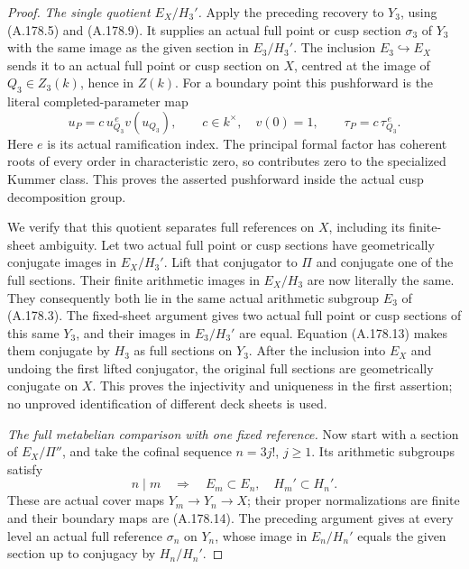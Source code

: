 \begin{proof}
\emph{The single quotient \(E_X/H_3'\).}
Apply the preceding recovery to \(Y_3\), using
(A.178.5) and (A.178.9).  It supplies an actual full point
or cusp section \(\sigma_3\) of \(Y_3\) with the same
image as the given section in \(E_3/H_3'\).
The inclusion \(E_3\hookrightarrow E_X\) sends it to
an actual full point or cusp section on \(X\), centred at
the image of \(Q_3\in Z_3(k)\), hence in \(Z(k)\).
For a boundary point this pushforward is the literal
completed-parameter map
\[
 u_P=c\,u_{Q_3}^{\,e}v(u_{Q_3}),\qquad
 c\in k^\times,\quad v(0)=1,\qquad
                         \tau_P=c\,\tau_{Q_3}^{\,e}.
\tag{A.178.14}
\]
Here \(e\) is its actual ramification index.  The
principal formal factor has coherent roots of every order
in characteristic zero, so contributes zero to the
specialized Kummer class.  This proves the asserted
pushforward inside the actual cusp decomposition group.

We verify that this quotient separates full references on
\(X\), including its finite-sheet ambiguity.  Let two
actual full point or cusp sections have geometrically
conjugate images in \(E_X/H_3'\).  Lift that conjugator
to \(\Pi\) and conjugate one of the full sections.
Their finite arithmetic images in \(E_X/H_3\) are now
literally the same.  They consequently both lie in the
same actual arithmetic subgroup \(E_3\) of (A.178.3).
The fixed-sheet argument gives two actual full point or
cusp sections of this same \(Y_3\), and their images in
\(E_3/H_3'\) are equal.  Equation (A.178.13) makes them
conjugate by \(H_3\) as full sections on \(Y_3\).
After the inclusion into \(E_X\) and undoing the first
lifted conjugator, the original full sections are
geometrically conjugate on \(X\).  This proves the
injectivity and uniqueness in the first assertion; no
unproved identification of different deck sheets is used.

\emph{The full metabelian comparison with one fixed reference.}
Now start with a section of \(E_X/\Pi''\), and take the
cofinal sequence \(n=3j!\), \(j\ge1\).
Its arithmetic subgroups satisfy
\[
              n\mid m\quad\Longrightarrow\quad
                   E_m\subset E_n,\quad H_m'\subset H_n'.
\tag{A.178.15}
\]
These are actual cover maps \(Y_m\to Y_n\to X\);
their proper normalizations are finite and their boundary
maps are (A.178.14).  The preceding argument gives at
every level an actual full reference \(\sigma_n\) on
\(Y_n\), whose image in \(E_n/H_n'\) equals the given
section up to conjugacy by \(H_n/H_n'\).


\end{proof}
